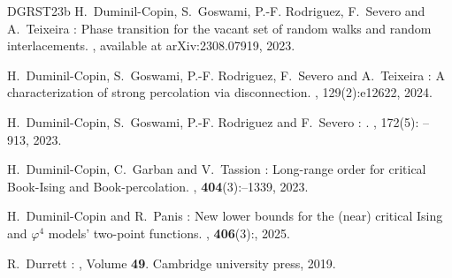 \documentclass[11pt,a4paper]{article}
\theoremstyle{definition}
\numberwithin{equation}{section}
\begin{document}
\begin{thebibliography}{DGRST23b}
H.~\bgroup\fonteauteurs\bgroup Duminil-Copin\egroup\egroup{}, S.~\bgroup\fonteauteurs\bgroup Goswami\egroup\egroup{}, P.-F. \bgroup\fonteauteurs\bgroup Rodriguez\egroup\egroup{}, F.~\bgroup\fonteauteurs\bgroup Severo\egroup\egroup{} and A.~\bgroup\fonteauteurs\bgroup Teixeira\egroup\egroup{} :
\newblock Phase transition for the vacant set of random walks and random interlacements.
, available at arXiv:2308.07919, 2023.

H.~\bgroup\fonteauteurs\bgroup Duminil-Copin\egroup\egroup{}, S.~\bgroup\fonteauteurs\bgroup Goswami\egroup\egroup{}, P.-F. \bgroup\fonteauteurs\bgroup Rodriguez\egroup\egroup{}, F.~\bgroup\fonteauteurs\bgroup Severo\egroup\egroup{} and A.~\bgroup\fonteauteurs\bgroup Teixeira\egroup\egroup{} :
\newblock A characterization of strong percolation via disconnection.
, 129(2)\string:\relax e12622, 2024.

H.~\bgroup\fonteauteurs\bgroup Duminil-Copin\egroup\egroup{}, S.~\bgroup\fonteauteurs\bgroup Goswami\egroup\egroup{}, P.-F. \bgroup\fonteauteurs\bgroup Rodriguez\egroup\egroup{} and F.~\bgroup\fonteauteurs\bgroup Severo\egroup\egroup{} :
.
, 172(5)\string: -- 913, 2023.

H.~\bgroup\fonteauteurs\bgroup Duminil-Copin\egroup\egroup{}, C.~\bgroup\fonteauteurs\bgroup Garban\egroup\egroup{} and V.~\bgroup\fonteauteurs\bgroup Tassion\egroup\egroup{} :
\newblock Long-range order for critical {B}ook-{I}sing and {B}ook-percolation.
, \textbf{404}(3)\string:--1339, 2023.

H.~\bgroup\fonteauteurs\bgroup Duminil-Copin\egroup\egroup{} and R.~\bgroup\fonteauteurs\bgroup Panis\egroup\egroup{} :
\newblock New lower bounds for the (near) critical {I}sing and $\varphi^4$ models' two-point functions.
, \textbf{406}(3)\string:\relax, 2025.




R.~\bgroup\fonteauteurs\bgroup Durrett\egroup\egroup{} :
, Volume \textbf{49}.
\newblock Cambridge university press, 2019.



\end{thebibliography}
\end{document}
